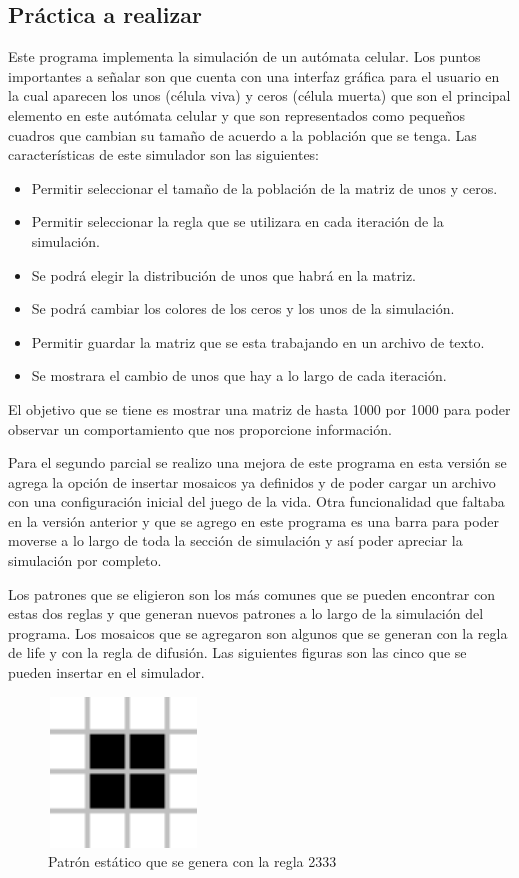 \subsection{Práctica a realizar}
Este programa implementa la simulación de un autómata celular. Los puntos importantes a señalar son que cuenta con una interfaz gráfica para el usuario en la cual aparecen los unos (célula viva) y ceros (célula muerta) que son el principal elemento en este autómata celular y que son representados como pequeños cuadros que cambian su tamaño de acuerdo a la población que se tenga. Las características de este simulador son las siguientes:
\begin{itemize}
 \item Permitir seleccionar el tamaño de la población de la matriz de unos y ceros.
 \item Permitir seleccionar la regla que se utilizara en cada iteración de la simulación.
 \item Se podrá elegir la distribución de unos que habrá en la matriz.
 \item Se podrá cambiar los colores de los ceros y los unos de la simulación.
 \item Permitir guardar la matriz que se esta trabajando en un archivo de texto.
 \item Se mostrara el cambio de unos que hay a lo largo de cada iteración.
\end{itemize}
El objetivo que se tiene es mostrar una matriz de hasta 1000 por 1000 para poder observar un comportamiento que nos proporcione información.

Para el segundo parcial se realizo una mejora de este programa en esta versión se agrega la opción de insertar mosaicos ya definidos y de poder cargar un archivo con una configuración inicial del juego de la vida. Otra funcionalidad que faltaba en la versión anterior y que se agrego en este programa es una barra para poder moverse a lo largo de toda la sección de simulación y así poder apreciar la simulación por completo.

Los patrones que se eligieron son los más comunes que se pueden encontrar con estas dos reglas y que generan nuevos patrones a lo largo de la simulación del programa. Los mosaicos que se agregaron son algunos que se generan con la regla de life y con la regla de difusión. Las siguientes figuras son las cinco que se pueden insertar en el simulador.

\begin{figure}[H]
\begin{center}
 \includegraphics[width=4cm, height=4cm]{./img/cuadrado.png}
 \caption{Patrón estático que se genera con la regla 2333}
 \label{fig:cuadrado}
\end{center}
\end{figure}

